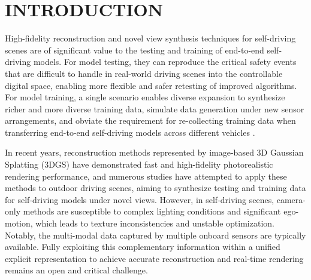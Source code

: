 \documentclass[letterpaper, 10 pt, conference]{ieeeconf}  %
\begin{document}
\section{INTRODUCTION}

High-fidelity reconstruction and novel view synthesis techniques for self-driving scenes are of significant value to the testing and training of end-to-end self-driving models. For model testing, they can reproduce the critical safety events that are difficult to handle in real-world driving scenes into the controllable digital space, enabling more flexible and safer retesting of improved algorithms. For model training, a single scenario enables diverse expansion to synthesize richer and more diverse training data, simulate data generation under new sensor arrangements, and obviate the requirement for re-collecting training data when transferring end-to-end self-driving models across different vehicles \cite{ref34}.

In recent years, reconstruction methods represented by image-based 3D Gaussian Splatting (3DGS)  \cite{ref1} have demonstrated fast and high-fidelity photorealistic rendering performance, and numerous studies have attempted to apply these methods to outdoor driving scenes, aiming to synthesize testing and training data for self-driving models under novel views. However, in self-driving scenes, camera-only methods \cite{ref8,ref11,ref15,ref37} are susceptible to complex lighting conditions and significant ego-motion, which leads to texture inconsistencies and unstable optimization. Notably, the multi-modal data captured by multiple onboard sensors are typically available. Fully exploiting this complementary information within a unified explicit representation to achieve accurate reconstruction and real-time rendering remains an open and critical challenge.
\end{document}
